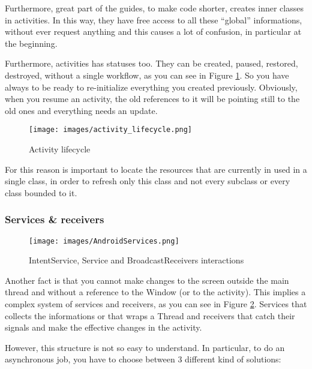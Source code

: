 Furthermore, great part of the guides, to make code shorter, creates inner classes in activities. In this way, they have free access to all these ``global'' informations, without ever request anything and this causes a lot of confusion, in particular at the beginning.

Furthermore, activities has statuses too. They can be created, paused, restored, destroyed, without a single workflow, as you can see in Figure \ref{fig:activityLifecycle}. So you have always to be ready to re-initialize everything you created previously. Obviously, when you resume an activity, the old references to it will be pointing still to the old ones and everything needs an update.

\begin{figure}[H]
\centering %
\texttt{[image: images/activity\_lifecycle.png]}
\caption{Activity lifecycle}
\label{fig:activityLifecycle}
\end{figure}

For this reason is important to locate the resources that are currently in used in a single class, in order to refresh only this class and not every subclass or every class bounded to it.

\subsubsection{Services \& receivers}

\begin{figure}[H]
\centering %
\texttt{[image: images/AndroidServices.png]}
\caption{IntentService, Service and BroadcastReceivers interactions}
\label{fig:androidServices}
\end{figure}

Another fact is that you cannot make changes to the screen outside the main thread and without a reference to the Window (or to the activity). This implies a complex system of services and receivers, as you can see in Figure \ref{fig:androidServices}. Services that collects the informations or that wraps a Thread and receivers that catch their signals and make the effective changes in the activity. 

However, this structure is not so easy to understand. In particular, to do an asynchronous job, you have to choose between 3 different kind of solutions:

